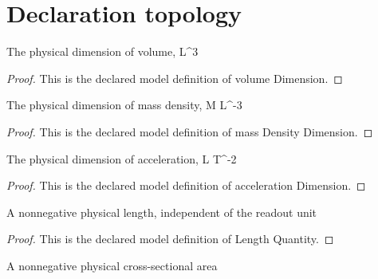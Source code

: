 \section{Declaration topology}
\begin{definition}
  \label{def:physics:phyx-mini-0364:phyxminiproblems-problemphyxmini0364-volumedimension}
  The physical dimension of volume, L\textasciicircum{}3
\end{definition}
\begin{proof}
  This is the declared model definition of volume Dimension.
\end{proof}
\begin{definition}
  \label{def:physics:phyx-mini-0364:phyxminiproblems-problemphyxmini0364-massdensitydimension}
  The physical dimension of mass density, M L\textasciicircum{}-3
\end{definition}
\begin{proof}
  This is the declared model definition of mass Density Dimension.
\end{proof}
\begin{definition}
  \label{def:physics:phyx-mini-0364:phyxminiproblems-problemphyxmini0364-accelerationdimension}
  The physical dimension of acceleration, L T\textasciicircum{}-2
\end{definition}
\begin{proof}
  This is the declared model definition of acceleration Dimension.
\end{proof}
\begin{definition}
  \label{def:physics:phyx-mini-0364:phyxminiproblems-problemphyxmini0364-lengthquantity}
  A nonnegative physical length, independent of the readout unit
\end{definition}
\begin{proof}
  This is the declared model definition of Length Quantity.
\end{proof}
\begin{definition}
  \label{def:physics:phyx-mini-0364:phyxminiproblems-problemphyxmini0364-areaquantity}
  A nonnegative physical cross-sectional area
\end{definition}
